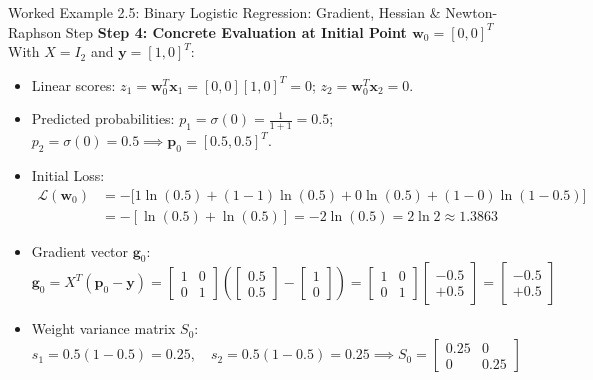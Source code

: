 \begin{examplebox}[breakable]{Worked Example 2.5: Binary Logistic Regression: Gradient, Hessian \& Newton-Raphson Step}
\textbf{Step 4: Concrete Evaluation at Initial Point $\mathbf{w}_0 = [0, 0]^T$}
With $X = I_2$ and $\mathbf{y} = [1, 0]^T$:
\begin{itemize}
    \item Linear scores: $z_1 = \mathbf{w}_0^T \mathbf{x}_1 = [0, 0][1, 0]^T = 0$; $z_2 = \mathbf{w}_0^T \mathbf{x}_2 = 0$.
    \item Predicted probabilities: $p_1 = \sigma(0) = \frac{1}{1 + 1} = 0.5$; $p_2 = \sigma(0) = 0.5 \implies \mathbf{p}_0 = [0.5, 0.5]^T$.
    \item Initial Loss:
    \begin{align*}
    \mathcal{L}(\mathbf{w}_0) &= -\Big[ 1 \ln(0.5) + (1-1)\ln(0.5) + 0\ln(0.5) + (1-0)\ln(1-0.5) \Big] \\
    &= -[ \ln(0.5) + \ln(0.5) ] = -2 \ln(0.5) = 2 \ln 2 \approx \mathbf{1.3863}
    \end{align*}
    \item Gradient vector $\mathbf{g}_0$:
    \begin{equation*}
    \mathbf{g}_0 = X^T (\mathbf{p}_0 - \mathbf{y}) = \begin{bmatrix} 1 & 0 \\ 0 & 1 \end{bmatrix} \left( \begin{bmatrix} 0.5 \\ 0.5 \end{bmatrix} - \begin{bmatrix} 1 \\ 0 \end{bmatrix} \right) = \begin{bmatrix} 1 & 0 \\ 0 & 1 \end{bmatrix} \begin{bmatrix} -0.5 \\ +0.5 \end{bmatrix} = \mathbf{\begin{bmatrix} -0.5 \\ +0.5 \end{bmatrix}}
    \end{equation*}
    \item Weight variance matrix $S_0$:
    \begin{equation*}
    s_1 = 0.5(1 - 0.5) = 0.25, \quad s_2 = 0.5(1 - 0.5) = 0.25 \implies S_0 = \begin{bmatrix} 0.25 & 0 \\ 0 & 0.25 \end{bmatrix}
    \end{equation*}

\end{itemize}
\end{examplebox}
